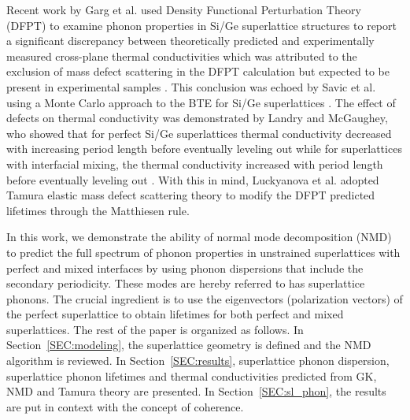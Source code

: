 Recent work by Garg et al. used Density Functional Perturbation Theory (DFPT) to examine phonon properties in Si/Ge superlattice structures to report a significant discrepancy between theoretically predicted and experimentally measured cross-plane thermal conductivities which was attributed to the exclusion of mass defect scattering in the DFPT calculation but expected to be present in experimental samples \cite{doi:10.1021/nl202186y}. This conclusion was echoed by Savic et al. using a Monte Carlo approach to the BTE for Si/Ge superlattices \cite{savic:073113}. The effect of defects on thermal conductivity was demonstrated by Landry and McGaughey, who showed that for perfect Si/Ge superlattices thermal conductivity decreased with increasing period length before eventually leveling out while for superlattices with interfacial mixing, the thermal conductivity increased with period length before eventually leveling out \cite{PhysRevB.79.075316}. With this in mind, Luckyanova et al. \cite{Luckyanova16112012} adopted Tamura elastic mass defect scattering theory \cite{tamura_isotope_1983} to modify the DFPT predicted lifetimes through the Matthiesen rule.

In this work, we demonstrate the ability of normal mode decomposition (NMD) to predict the full spectrum of phonon properties in unstrained superlattices with perfect and mixed interfaces by using phonon dispersions that include the secondary periodicity. These modes are hereby referred to has superlattice phonons. The crucial ingredient is to use the eigenvectors (polarization vectors) of the perfect superlattice to obtain lifetimes for both perfect and mixed superlattices. The rest of the paper is organized as follows. In Section~\ref{SEC:modeling}, the superlattice geometry is defined and the NMD algorithm is reviewed. In Section~\ref{SEC:results}, superlattice phonon dispersion, superlattice phonon lifetimes and thermal conductivities predicted from GK, NMD and Tamura theory are presented. In Section~\ref{SEC:sl_phon}, the results are put in context with the concept of coherence.

